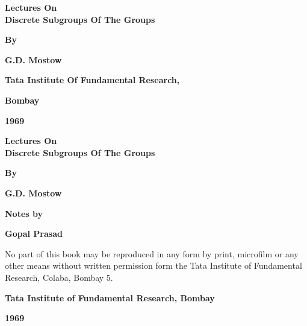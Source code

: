 \thispagestyle{empty}
\begin{center}
{\Large\bf Lectures On}\\[5pt]
{\Large\bf Discrete Subgroups Of The Groups}
\vskip 1cm

{\bf  By}
\medskip


{\large\bf  G.D. Mostow}
\vfill


{\bf Tata Institute Of Fundamental Research,}

{\bf  Bombay}

{\bf  1969}
\end{center}
\newpage

\thispagestyle{empty}
\begin{center}
{\Large\bf Lectures On}\\[5pt]
{\Large\bf Discrete Subgroups Of The Groups}
\vskip 1cm

{\bf  By}
\medskip


{\large\bf  G.D. Mostow}
\vfill


{\bf  Notes by}
\medskip

{\large\bf  Gopal Prasad}
 \vfill


\parbox{0.7\textwidth}{No part of this book may be reproduced in any form by print,
microfilm or any other means without written permission form the
Tata Institute of Fundamental Research, Colaba, Bombay 5.}

\vfill
{\bf Tata Institute of Fundamental Research, Bombay}

{\bf 1969}
\end{center}
